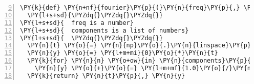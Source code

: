 \begin{Verbatim}[commandchars=\\\{\},numbers=left,numbersep=0.5em,firstnumber=9]
\PY{k}{def} \PY{n+nf}{fourier}\PY{p}{(}\PY{n}{freq}\PY{p}{,} \PY{n}{components}\PY{p}{,} \PY{n}{tlims}\PY{o}{=}\PY{p}{[}\PY{l+m+mi}{0}\PY{p}{,}\PY{l+m+mi}{1}\PY{p}{]}\PY{p}{)}\PY{p}{:}
  \PY{l+s+sd}{\PYZdq{}\PYZdq{}\PYZdq{}}
\PY{l+s+sd}{  freq is a number}
\PY{l+s+sd}{  components is a list of numbers}
\PY{l+s+sd}{  \PYZdq{}\PYZdq{}\PYZdq{}}
  \PY{n}{t} \PY{o}{=} \PY{n}{np}\PY{o}{.}\PY{n}{linspace}\PY{p}{(}\PY{o}{*}\PY{n}{tlims}\PY{p}{,} \PY{n}{num}\PY{o}{=}\PY{l+m+mi}{1000}\PY{p}{)}
  \PY{n}{y} \PY{o}{=} \PY{l+m+mi}{0}\PY{o}{*}\PY{n}{t}
  \PY{k}{for} \PY{n}{n} \PY{o+ow}{in} \PY{n}{components}\PY{p}{:}
    \PY{n}{y} \PY{o}{+}\PY{o}{=} \PY{l+m+mf}{1.0}\PY{o}{/}\PY{n}{n} \PY{o}{*} \PY{n}{np}\PY{o}{.}\PY{n}{sin}\PY{p}{(}\PY{l+m+mi}{2}\PY{o}{*}\PY{n}{np}\PY{o}{.}\PY{n}{pi}\PY{o}{*}\PY{p}{(}\PY{n}{freq}\PY{o}{*}\PY{n}{n}\PY{p}{)}\PY{o}{*}\PY{n}{t}\PY{p}{)}
  \PY{k}{return} \PY{n}{t}\PY{p}{,} \PY{n}{y}
\end{Verbatim}

